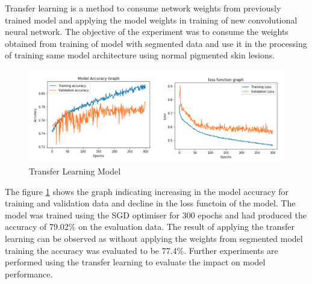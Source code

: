Transfer learning is a method to consume network weights from previously trained model and applying the model 
weights in training of new convolutional neural network. The objective of the experiment was to consume the 
weights obtained from training of model with segmented data and use it in the processing of training same model 
architecture using normal pigmented skin lesions. 
\begin{figure}[!htp]
    \centering
    \includegraphics[width=\textwidth]{Images/transferLearning.png}
    \caption{Transfer Learning Model}
    \label{fig:translearning}
\end{figure}

The figure \ref{fig:translearning} shows the graph indicating increasing in the model accuracy for training 
and validation data and decline in the loss functoin of the model. The model was trained using the SGD optimiser 
for 300 epochs and had produced the accuracy of 79.02\% on the evaluation data. The result of applying the 
transfer learning can be observed as without applying the weights from segmented model training the accuracy 
was evaluated to be 77.4\%. Further experiments are performed using the transfer learning to evaluate the 
impact on model performance.